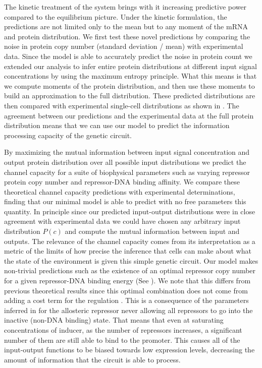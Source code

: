 The kinetic treatment of the system brings with it increasing predictive power
compared to the equilibrium picture. Under the kinetic formulation, the
predictions are not limited only to the mean but to any moment of the mRNA and
protein distribution. We first test these novel predictions by comparing the
noise in protein copy number (standard deviation / mean) with experimental
data. Since the model is able to accurately predict the noise in protein count
we extended our analysis to infer entire protein distributions at different
input signal concentrations by using the maximum entropy principle. What this
means is that we compute moments of the protein distribution, and then use
these moments to build an approximation to the full distribution. These
predicted distributions are then compared with experimental single-cell
distributions as shown in . The agreement between our
predictions and the experimental data at the full protein distribution means
that we can use our model to predict the information processing capacity of the
genetic circuit.

By maximizing the mutual information between input signal concentration and
output protein distribution over all possible input distributions we predict
the channel capacity for a suite of biophysical parameters such as varying
repressor protein copy number and repressor-DNA binding affinity. We compare
these theoretical channel capacity predictions with experimental
determinations, finding that our minimal model is able to predict with no free
parameters this quantity. In principle since our predicted input-output
distributions were in close agreement with experimental data we could have
chosen any arbitrary input distribution $P(c)$ and compute the mutual
information between input and outputs. The relevance of the channel capacity
comes from its interpretation as a metric of the limits of how precise the
inference that cells can make about what the state of the environment is given
this simple genetic circuit. Our model makes non-trivial predictions such as
the existence of an optimal repressor copy number for a given repressor-DNA
binding energy (See ). We note that this differs from
previous theoretical results since this optimal combination does not come from
adding a cost term for the regulation \cite{Tkacik2011}. This is a consequence
of the parameters inferred in \cite{Razo-Mejia2018} for the allosteric
repressor never allowing all repressors to go into the inactive (non-DNA
binding) state. That means that even at saturating concentrations of inducer,
as the number of repressors increases, a significant number of them are still
able to bind to the promoter. This causes all of the input-output functions to
be biased towards low expression levels, decreasing the amount of information
that the circuit is able to process.

